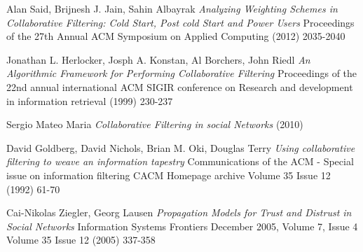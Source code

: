 \documentclass{VUMIFInfMagistrinis}
\begin{document}
\begin{thebibliography}{17}
Alan Said, Brijnesh J. Jain, Sahin Albayrak
\textit{Analyzing Weighting Schemes in Collaborative Filtering: Cold Start, Post cold Start and Power Users}
Proceedings of the 27th Annual ACM Symposium on Applied Computing (2012) 2035-2040
	
Jonathan L. Herlocker, Josph A. Konstan, Al Borchers, John Riedl
\textit{An Algorithmic Framework for Performing Collaborative Filtering}
Proceedings of the 22nd annual international ACM SIGIR conference on Research and development in information retrieval (1999)  230-237
	
Sergio Mateo Maria
\textit{Collaborative Filtering in social Networks}
(2010) 
	
David Goldberg, David Nichols, Brian M. Oki, Douglas Terry
\textit{Using collaborative filtering to weave an information tapestry}
Communications of the ACM - Special issue on information filtering CACM Homepage archive
Volume 35 Issue 12 (1992)  61-70

Cai-Nikolas Ziegler, Georg Lausen
\textit{Propagation Models for Trust and Distrust in Social Networks}
Information Systems Frontiers December 2005, Volume 7, Issue 4
Volume 35 Issue 12 (2005)  337-358
	
\end{thebibliography}
\end{document}
